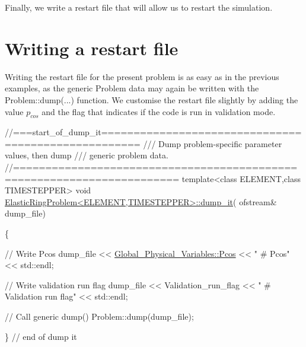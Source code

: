 Finally, we write a restart file that will allow us to restart the simulation.






 

\hypertarget{index_dump}{}\section{Writing a restart file}\label{index_dump}
Writing the restart file for the present problem is as easy as in the previous examples, as the generic {\ttfamily Problem} data may again be written with the {\ttfamily Problem\+::dump}(...) function. We customise the restart file slightly by adding the value $ p_{cos} $ and the flag that indicates if the code is run in validation mode.


\begin{DoxyCodeInclude}
\textcolor{comment}{//===start\_of\_dump\_it====================================================}
\textcolor{comment}{/// Dump problem-specific parameter values, then dump}
\textcolor{comment}{}\textcolor{comment}{/// generic problem data.}
\textcolor{comment}{}\textcolor{comment}{//=======================================================================}
\textcolor{keyword}{template}<\textcolor{keyword}{class} ELEMENT,\textcolor{keyword}{class} TIMESTEPPER>
\textcolor{keywordtype}{void} \hyperlink{classElasticRingProblem_a5d932c03b49cb7fe4da256a5c3c9be26}{ElasticRingProblem<ELEMENT,TIMESTEPPER>::dump\_it}(
      ofstream& dump\_file)

\{
  
 \textcolor{comment}{// Write Pcos}
 dump\_file << \hyperlink{namespaceGlobal__Physical__Variables_ab55734aaa66260cd9d4bf68a4ecafdd5}{Global\_Physical\_Variables::Pcos} << \textcolor{stringliteral}{" # Pcos"} << std::endl;

 \textcolor{comment}{// Write validation run flag}
 dump\_file << Validation\_run\_flag 
           << \textcolor{stringliteral}{" # Validation run flag"} << std::endl;

 \textcolor{comment}{// Call generic dump()}
 Problem::dump(dump\_file);

\} \textcolor{comment}{// end of dump it}

\end{DoxyCodeInclude}




